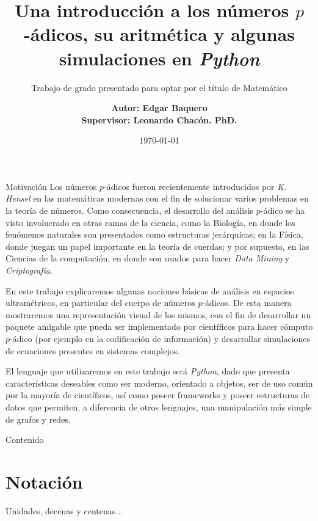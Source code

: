 \documentclass{beamer}
\title{Una introducción a los números $p$-ádicos, su aritmética y algunas simulaciones en \textit{Python}}
\subtitle{Trabajo de grado presentado para optar por el título de
Matemático}
\date{\today}
\author{\bf{Autor: }Edgar Baquero 
	\\ \bf{Supervisor: }Leonardo Chacón. PhD.}
\institute{Pontificia Universidad Javeriana,
Facultad de Ciencias\\
Departamento de Matemáticas}
\theoremstyle{definition}
\numberwithin{equation}{section}
\begin{document}
  \maketitle
  
\begin{frame}[allowframebreaks]{Motivación}
	Los números $p$-ádicos fueron recientemente introducidos por \textit{K. Hensel} en las matemáticas modernas con el fin de solucionar varios problemas en la teoría de números. Como consecuencia, el desarrollo del análisis $p$-ádico se ha visto involucrado en otras ramas de la ciencia, como la Biología, en donde los fenómenos naturales son presentados como estructuras jerárquicas\nocite{Av-5}; en la Física, donde juegan un papel importante en la teoría de cuerdas\nocite{Dragovich-2017}; y por supuesto, en las Ciencias de la computación, en donde son usados para hacer \textit{Data Mining} y \textit{Criptografía}\nocite{Dragovich-2017}.
	
	En este trabajo explicaremos algunas nociones básicas de análisis en espacios ultramétricos, en particular del cuerpo de números $p$-ádicos. De esta manera mostraremos una representación visual de los mismos, con el fin de desarrollar un paquete amigable que pueda ser implementado por científicos para hacer cómputo $p$-ádico (por ejemplo en la codificación de información) y desarrollar simulaciones de ecuaciones presentes en sistemas complejos.
	
	El lenguaje que utilizaremos en este trabajo será \textit{Python}, dado que presenta características deseables como ser moderno, orientado a objetos, ser de uso común por la mayoría de científicos, así como poseer frameworks y poseer estructuras de datos que permiten, a diferencia de otros lenguajes, una manipulación más simple de grafos y redes.

\end{frame}
\begin{frame}{Contenido}
	\tableofcontents
\end{frame}
  \section{Notación}

  \begin{frame}{Unidades, decenas y centenas...}
    
    \begin{center}
    \end{center}
  \end{frame}
\end{document}
